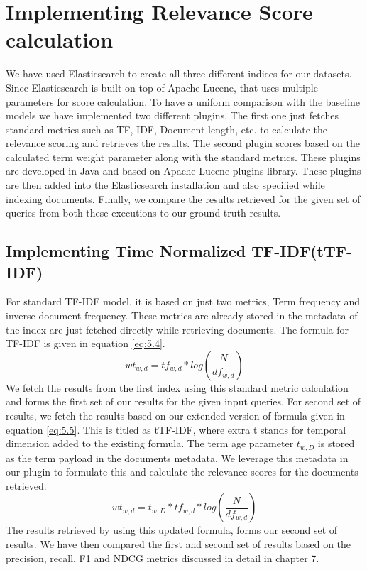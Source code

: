 \section{Implementing Relevance Score calculation}
We have used Elasticsearch to create all three different indices for our datasets. Since Elasticsearch is built on top of Apache Lucene, that uses multiple parameters for score calculation. To have a uniform comparison with the baseline models we have implemented two different plugins. The first one just fetches standard metrics such as TF, IDF, Document length, etc. to calculate the relevance scoring and retrieves the results. The second plugin scores based on the calculated term weight parameter along with the standard metrics. These plugins are developed in Java and based on Apache Lucene plugins library. These plugins are then added into the Elasticsearch installation and also specified while indexing documents. Finally, we compare the results retrieved for the given set of queries from both these executions to our ground truth results. 

\subsection{Implementing Time Normalized TF-IDF(tTF-IDF)}
For standard TF-IDF model, it is based on just two metrics, Term frequency and inverse document frequency. These metrics are already stored in the metadata of the index are just fetched directly while retrieving documents. The formula for TF-IDF is given in equation \ref{eq:5.4}.
\begin{equation} \label{eq:5.4}
        wt_{w,d} = tf_{w,d}*log(\frac{N}{df_{w,d}})   
\end{equation}  
We fetch the results from the first index using this standard metric calculation and forms the first set of our results for the given input queries. For second set of results, we fetch the results based on our extended version of formula given in equation \ref{eq:5.5}. This is titled as tTF-IDF, where extra t stands for temporal dimension added to the existing formula. The term age parameter $t_{w,D}$ is stored as the term payload in the documents metadata. We leverage this metadata in our plugin to formulate this and calculate the relevance scores for the documents retrieved.
\begin{equation} \label{eq:5.5}
        wt_{w,d} = t_{w,D}*tf_{w,d}*log(\frac{N}{df_{w,d}})   
\end{equation} 
The results retrieved by using this updated formula, forms our second set of results. We have then compared the first and second set of results based on the precision, recall, F1 and NDCG metrics discussed in detail in chapter 7.

